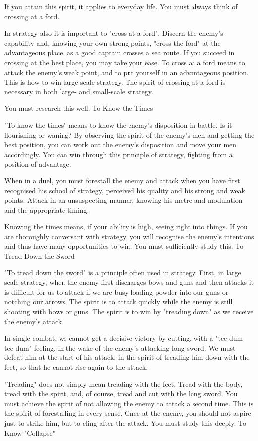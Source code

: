 If you attain this spirit, it applies to everyday life. You must always think of crossing at a ford.

In strategy also it is important to "cross at a ford". Discern the enemy's capability and, knowing your own strong points, "cross the ford" at the advantageous place, as a good captain crosses a sea route. If you succeed in crossing at the best place, you may take your ease. To cross at a ford means to attack the enemy's weak point, and to put yourself in an advantageous position. This is how to win large-scale strategy. The spirit of crossing at a ford is necessary in both large- and small-scale strategy.

You must research this well.
To Know the Times

"To know the times" means to know the enemy's disposition in battle. Is it flourishing or waning? By observing the spirit of the enemy's men and getting the best position, you can work out the enemy's disposition and move your men accordingly. You can win through this principle of strategy, fighting from a position of advantage.

When in a duel, you must forestall the enemy and attack when you have first recognised his school of strategy, perceived his quality and his strong and weak points. Attack in an unsuspecting manner, knowing his metre and modulation and the appropriate timing.

Knowing the times means, if your ability is high, seeing right into things. If you are thoroughly conversant with strategy, you will recognise the enemy's intentions and thus have many opportunities to win. You must sufficiently study this.
To Tread Down the Sword

"To tread down the sword" is a principle often used in strategy. First, in large scale strategy, when the enemy first discharges bows and guns and then attacks it is difficult for us to attack if we are busy loading powder into our guns or notching our arrows. The spirit is to attack quickly while the enemy is still shooting with bows or guns. The spirit is to win by "treading down" as we receive the enemy's attack.

In single combat, we cannot get a decisive victory by cutting, with a "tee-dum tee-dum" feeling, in the wake of the enemy's attacking long sword. We must defeat him at the start of his attack, in the spirit of treading him down with the feet, so that he cannot rise again to the attack.

"Treading" does not simply mean treading with the feet. Tread with the body, tread with the spirit, and, of course, tread and cut with the long sword. You must achieve the spirit of not allowing the enemy to attack a second time. This is the spirit of forestalling in every sense. Once at the enemy, you should not aspire just to strike him, but to cling after the attack. You must study this deeply.
To Know "Collapse"

